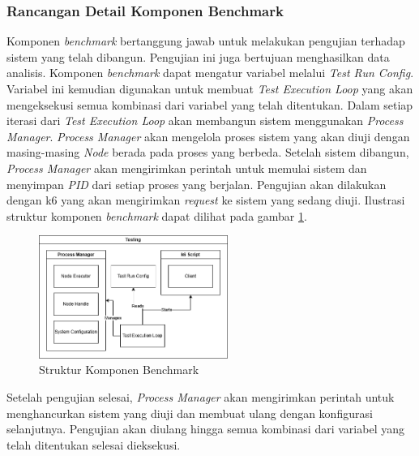 \subsubsection{Rancangan Detail Komponen Benchmark}
\label{subsubsection:detail-data-benchmark}

Komponen \textit{benchmark} bertanggung jawab untuk melakukan pengujian terhadap sistem yang telah dibangun. Pengujian ini juga bertujuan menghasilkan data analisis. Komponen \textit{benchmark} dapat mengatur variabel melalui \textit{Test Run Config}. Variabel ini kemudian digunakan untuk membuat \textit{Test Execution Loop} yang akan mengeksekusi semua kombinasi dari variabel yang telah ditentukan. Dalam setiap iterasi dari \textit{Test Execution Loop} akan membangun sistem menggunakan \textit{Process Manager}. \textit{Process Manager} akan mengelola proses sistem yang akan diuji dengan masing-masing \textit{Node} berada pada proses yang berbeda. Setelah sistem dibangun, \textit{Process Manager} akan mengirimkan perintah untuk memulai sistem dan menyimpan \textit{PID} dari setiap proses yang berjalan. Pengujian akan dilakukan dengan k6 yang akan mengirimkan \textit{request} ke sistem yang sedang diuji. Ilustrasi struktur komponen \textit{benchmark} dapat dilihat pada gambar \ref{fig:benchmark-structure}.

\begin{figure}[ht]
    \centering
    \includegraphics[width=0.55\textwidth]{resources/chapter-3/benchmark-architecture.png}
    \caption{Struktur Komponen Benchmark}
    \label{fig:benchmark-structure}
\end{figure}

Setelah pengujian selesai, \textit{Process Manager} akan mengirimkan perintah untuk menghancurkan sistem yang diuji dan membuat ulang dengan konfigurasi selanjutnya. Pengujian akan diulang hingga semua kombinasi dari variabel yang telah ditentukan selesai dieksekusi.